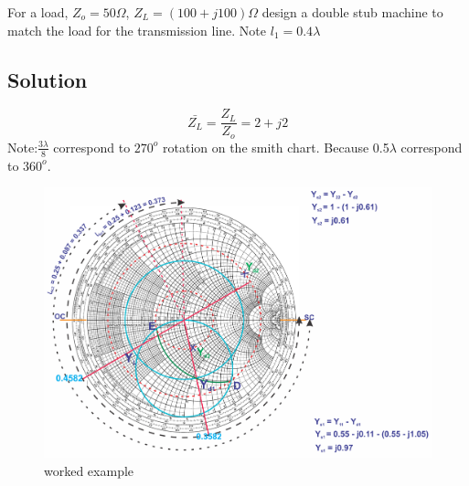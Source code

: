 \begin{exmp}
For a load, $Z_{o} = 50\Omega$, $Z_{L} = (100 + j100)\Omega$ design a double stub machine to match the load for the transmission line. Note $l_{1} = 0.4\lambda$
\subsection*{Solution}
$$\bar{Z_{L}} = \frac{Z_{L}}{Z_{o}} = 2 + j2$$
Note:$\frac{3\lambda}{8}$ correspond to $270^{o} $ rotation on the smith chart. Because 0.5$\lambda$ correspond to $ 360^{o}$. 
\begin{figure}[h]
\centering
\includegraphics[width=1\linewidth]{./graphics/question1}
\caption{worked example}
\end{figure}
				

\end{exmp}
